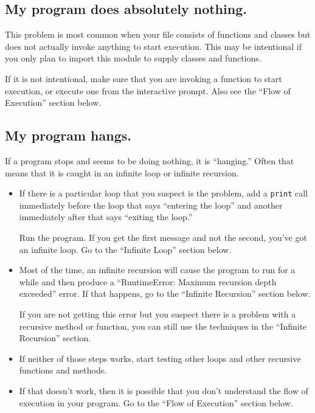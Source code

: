 \documentclass[10pt]{book}
\begin{document}
\subsection{My program does absolutely nothing.}

This problem is most common when your file consists of functions and
classes but does not actually invoke anything to start execution.
This may be intentional if you only plan to import this module to
supply classes and functions.

If it is not intentional, make sure that you
are invoking a function to start execution, or execute one from
the interactive prompt.  Also see the ``Flow of Execution'' section
below.


\subsection{My program hangs.}

If a program stops and seems to be doing nothing, it is ``hanging.''
Often that means that it is caught in an infinite loop or infinite
recursion.

\begin{itemize}

\item If there is a particular loop that you suspect is the
problem, add a {\tt print} call immediately before the loop that says
``entering the loop'' and another immediately after that says
``exiting the loop.''

Run the program.  If you get the first message and not the second,
you've got an infinite loop.  Go to the ``Infinite Loop'' section
below.

\item Most of the time, an infinite recursion will cause the program
to run for a while and then produce a ``RuntimeError: Maximum
recursion depth exceeded'' error.  If that happens, go to the
``Infinite Recursion'' section below.

If you are not getting this error but you suspect there is a problem
with a recursive method or function, you can still use the techniques
in the ``Infinite Recursion'' section.

\item If neither of those steps works, start testing other
loops and other recursive functions and methods.

\item If that doesn't work, then it is possible that
you don't understand the flow of execution in your program.
Go to the ``Flow of Execution'' section below.

\end{itemize}
\end{document}
